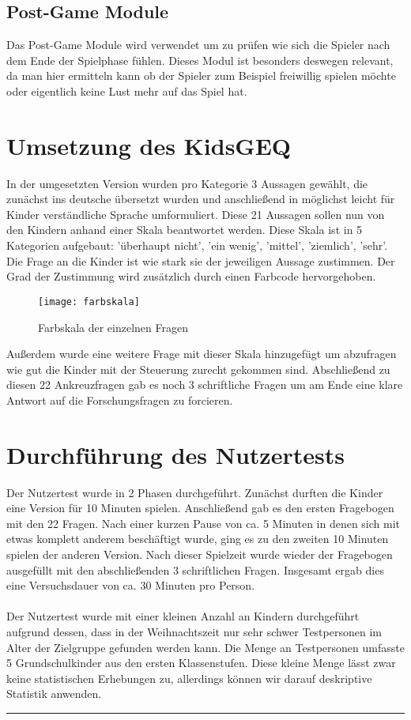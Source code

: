 \subsection{Post-Game Module}
Das Post-Game Module wird verwendet um zu prüfen wie sich die Spieler nach dem Ende der Spielphase fühlen. Dieses Modul ist besonders deswegen relevant, da man hier ermitteln kann ob der Spieler zum Beispiel freiwillig spielen möchte oder eigentlich keine Lust mehr auf das Spiel hat.
\section{Umsetzung des KidsGEQ}
In der umgesetzten Version wurden pro Kategorie 3 Aussagen gewählt, die zunächst ins deutsche übersetzt wurden und anschließend in möglichst leicht für Kinder verständliche Sprache umformuliert. Diese 21 Aussagen sollen nun von den Kindern anhand einer Skala beantwortet werden. Diese Skala ist in 5 Kategorien aufgebaut: 'überhaupt nicht', 'ein wenig', 'mittel', 'ziemlich', 'sehr'. Die Frage an die Kinder ist wie stark sie der jeweiligen Aussage zustimmen. Der Grad der Zustimmung wird zusätzlich durch einen Farbcode hervorgehoben. 

\begin{figure}[htb]
	\centering
	\texttt{[image: farbskala]}
	\caption{Farbskala der einzelnen Fragen\label{fig:farbskala}}
\end{figure}

Außerdem wurde eine weitere Frage mit dieser Skala hinzugefügt um abzufragen wie gut die Kinder mit der Steuerung zurecht gekommen sind. Abschließend zu diesen 22 Ankreuzfragen gab es noch 3 schriftliche Fragen um am Ende eine klare Antwort auf die Forschungsfragen zu forcieren. %
\section{Durchführung des Nutzertests} %
Der Nutzertest wurde in 2 Phasen durchgeführt. Zunächst durften die Kinder eine Version für 10 Minuten spielen. Anschließend gab es den ersten Fragebogen mit den 22 Fragen. Nach einer kurzen Pause von ca. 5 Minuten in denen sich mit etwas komplett anderem beschäftigt wurde, ging es zu den zweiten 10 Minuten spielen der anderen Version. Nach dieser Spielzeit wurde wieder der Fragebogen ausgefüllt mit den abschließenden 3 schriftlichen Fragen. Insgesamt ergab dies eine Versuchsdauer von ca. 30 Minuten pro Person.\\
\\
Der Nutzertest wurde mit einer kleinen Anzahl an Kindern durchgeführt aufgrund dessen, dass in der Weihnachtszeit nur sehr schwer Testpersonen im Alter der Zielgruppe gefunden werden kann. Die Menge an Testpersonen umfasste 5 Grundschulkinder aus den ersten Klassenstufen. Diese kleine Menge lässt zwar keine statistischen Erhebungen zu, allerdings können wir darauf deskriptive Statistik anwenden. 

\hfil\rule{0.4\textwidth}{0.4pt}